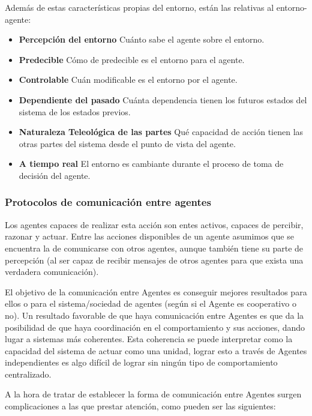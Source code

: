 Además de estas características propias del entorno, están las relativas al entorno-agente:

\begin{itemize}
	\item\textbf{Percepción del entorno} Cuánto sabe el agente sobre el entorno.
	\item\textbf{Predecible} Cómo de predecible es el entorno para el agente.
	\item\textbf{Controlable} Cuán modificable es el entorno por el agente.
	\item\textbf{Dependiente del pasado} Cuánta dependencia tienen los futuros estados del sistema de los estados previos.
	\item\textbf{Naturaleza Teleológica de las partes} Qué capacidad de acción tienen las otras partes del sistema desde el punto de vista del agente.
	\item\textbf{A tiempo real} El entorno es cambiante durante el proceso de toma de decisión del agente.
\end{itemize}

\subsubsection{Protocolos de comunicación entre agentes}

Los agentes capaces de realizar esta acción son entes activos, capaces de percibir, razonar y actuar. Entre las acciones disponibles de un agente asumimos que se encuentra la de comunicarse con otros agentes, aunque también tiene su parte de percepción (al ser capaz de recibir mensajes de otros agentes para que exista una verdadera comunicación).

El objetivo de la comunicación entre Agentes es conseguir mejores resultados para ellos o para el sistema/sociedad de agentes (según si el Agente es cooperativo o no). Un resultado favorable de que haya comunicación entre Agentes es que da la posibilidad de que haya coordinación en el comportamiento y sus acciones, dando lugar a sistemas más coherentes. Esta coherencia se puede interpretar como la capacidad del sistema de actuar como una unidad, lograr esto a través de Agentes independientes es algo difícil de lograr sin ningún tipo de comportamiento centralizado. 

A la hora de tratar de establecer la forma de comunicación entre Agentes surgen complicaciones a las que prestar atención, como pueden ser las siguientes:

